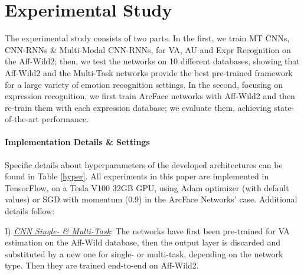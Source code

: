 \documentclass{bmvc2k}
\begin{document}
\begin{comment}
\begin{figure}[h]
\scalebox{0.95}{
\begin{tabular}{ccc}
  \texttt{[image: images/happy.png]} &   \texttt{[image: images/surprise.png]} &
 \texttt{[image: images/disgust.png]} \\   \texttt{[image: images/fear.png]} &
   \texttt{[image: images/sadness.png]} &   \texttt{[image: images/angry.png]} \\
\end{tabular}
}
\caption{Distributions of six basic expressions in the VA-Space}
\label{fig:basi_expr_dist_va}
\end{figure}
\end{comment}














\section{Experimental Study}
 \vskip-0.2cm
\noindent The experimental study consists of two parts. In the first, we train MT CNNs, CNN-RNNs \& Multi-Modal CNN-RNNs, for VA, AU and Expr Recognition on the Aff-Wild2; then, we test the networks on 10 different databases, showing that Aff-Wild2 and the Multi-Task networks provide the best pre-trained framework for a large variety of emotion recognition settings. In the second, focusing on expression recognition, we first train ArcFace networks with Aff-Wild2 and then re-train them with each expression database; we evaluate them, achieving state-of-the-art performance.

\paragraph{Implementation Details \& Settings}
Specific details about hyperparameters of the developed architectures can be found in Table \ref{hyper}.  All experiments in this paper are implemented in TensorFlow, on a Tesla V100 32GB GPU, using Adam optimizer (with default values) or SGD with momentum (0.9) in the ArcFace Networks' case. Additional details follow:

\noindent I) \underline{\textit{CNN Single- \& Multi-Task}}: The networks have first been pre-trained for VA estimation on the Aff-Wild database, then the output layer is discarded and substituted by a new one for single- or multi-task, depending on the network type. Then they are trained end-to-end on Aff-Wild2. 
\end{document}
